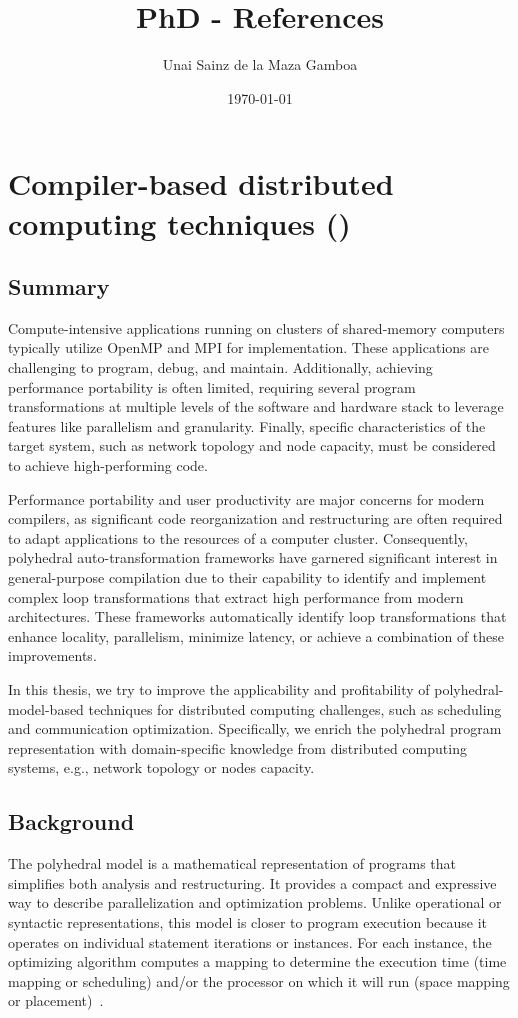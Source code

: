 \documentclass[a4paper, 11pt]{article}
\title{PhD - References}
\author{Unai Sainz de la Maza Gamboa}
\date{\today}
\begin{document}
\maketitle
\tableofcontents
\clearpage

% 
% 
% 

\section{Compiler-based distributed computing techniques ()}
\subsection{Summary}
Compute-intensive applications running on clusters of shared-memory computers typically utilize OpenMP and MPI for implementation. These applications are challenging to program, debug, and maintain. Additionally, achieving performance portability is often limited, requiring several program transformations at multiple levels of the software and hardware stack to leverage features like parallelism and granularity. Finally, specific characteristics of the target system, such as network topology and node capacity, must be considered to achieve high-performing code.

Performance portability and user productivity are major concerns for modern compilers, as significant code reorganization and restructuring are often required to adapt applications to the resources of a computer cluster. Consequently, polyhedral auto-transformation frameworks have garnered significant interest in general-purpose compilation due to their capability to identify and implement complex loop transformations that extract high performance from modern architectures. These frameworks automatically identify loop transformations that enhance locality, parallelism, minimize latency, or achieve a combination of these improvements.

In this thesis, we try to improve the applicability and profitability of polyhedral-model-based techniques for distributed computing challenges, such as scheduling and communication optimization. Specifically, we enrich the polyhedral program representation with domain-specific knowledge from distributed computing systems, e.g., network topology or nodes capacity.

\subsection{Background}
The polyhedral model is a mathematical representation of programs that simplifies both analysis and restructuring. It provides a compact and expressive way to describe parallelization and optimization problems. Unlike operational or syntactic representations, this model is closer to program execution because it operates on individual statement iterations or instances. For each instance, the optimizing algorithm computes a mapping to determine the execution time (time mapping or scheduling) and/or the processor on which it will run (space mapping or placement)~\cite{PouchetBCV07, PouchetBCC08}.
\end{document}
